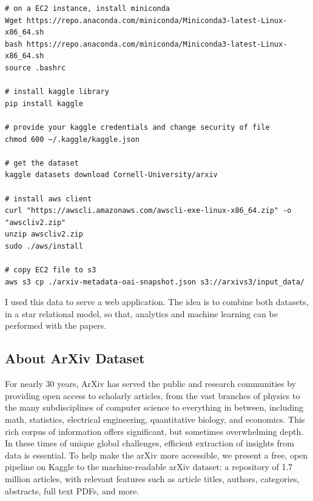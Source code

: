 \begin{mdframed}[backgroundcolor=light-gray, roundcorner=10pt,leftmargin=0, rightmargin=0, innerleftmargin=15, innertopmargin=15,innerbottommargin=15, outerlinewidth=0, linecolor=light-gray]
\begin{lstlisting}[caption={From kaggle to S3 file transfer.},label={transfer}] 
# on a EC2 instance, install miniconda
Wget https://repo.anaconda.com/miniconda/Miniconda3-latest-Linux-x86_64.sh
bash https://repo.anaconda.com/miniconda/Miniconda3-latest-Linux-x86_64.sh
source .bashrc

# install kaggle library
pip install kaggle

# provide your kaggle credentials and change security of file
chmod 600 ~/.kaggle/kaggle.json

# get the dataset
kaggle datasets download Cornell-University/arxiv

# install aws client
curl "https://awscli.amazonaws.com/awscli-exe-linux-x86_64.zip" -o "awscliv2.zip"
unzip awscliv2.zip
sudo ./aws/install

# copy EC2 file to s3
aws s3 cp ./arxiv-metadata-oai-snapshot.json s3://arxivs3/input_data/
\end{lstlisting}
\end{mdframed} 

I used this data to serve a web application. The idea is to combine both datasets, in a star relational model, so that, 
analytics and machine learning can be performed with the papers.\\

\subsection{About ArXiv Dataset}
For nearly 30 years, ArXiv has served the public and research communities by providing open access to scholarly articles, from the vast branches of physics to the many subdisciplines of computer science to everything in between, including math, statistics, electrical engineering, quantitative biology, and economics. This rich corpus of information offers significant, but sometimes overwhelming depth.\\

In these times of unique global challenges, efficient extraction of insights from data is essential. To help make the arXiv more accessible, we present a free, open pipeline on Kaggle to the machine-readable arXiv dataset: a repository of 1.7 million articles, with relevant features such as article titles, authors, categories, abstracts, full text PDFs, and more.\\

